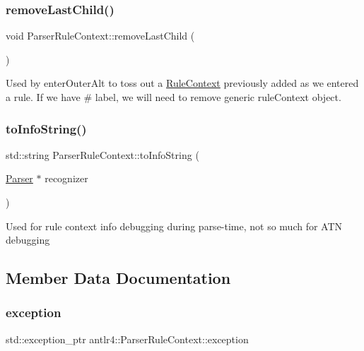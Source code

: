 \subsubsection{\texorpdfstring{remove\+Last\+Child()}{removeLastChild()}}
{\footnotesize\ttfamily void Parser\+Rule\+Context\+::remove\+Last\+Child (\begin{DoxyParamCaption}{ }\end{DoxyParamCaption})\hspace{0.3cm}{\ttfamily [virtual]}}

Used by enter\+Outer\+Alt to toss out a \hyperlink{classantlr4_1_1RuleContext}{Rule\+Context} previously added as we entered a rule. If we have \# label, we will need to remove generic rule\+Context object. \mbox{\label{classantlr4_1_1ParserRuleContext_a36fdb4f19d0b2dce76164b3ffee6d81e}} 
\subsubsection{\texorpdfstring{to\+Info\+String()}{toInfoString()}}
{\footnotesize\ttfamily std\+::string Parser\+Rule\+Context\+::to\+Info\+String (\begin{DoxyParamCaption}\item[{\hyperlink{classantlr4_1_1Parser}{Parser} $\ast$}]{recognizer }\end{DoxyParamCaption})\hspace{0.3cm}{\ttfamily [virtual]}}



Used for rule context info debugging during parse-\/time, not so much for A\+TN debugging 



\subsection{Member Data Documentation}
\mbox{\label{classantlr4_1_1ParserRuleContext_ac427da1597154161775151dfee4069fa}} 
\subsubsection{\texorpdfstring{exception}{exception}}
{\footnotesize\ttfamily std\+::exception\+\_\+ptr antlr4\+::\+Parser\+Rule\+Context\+::exception}

